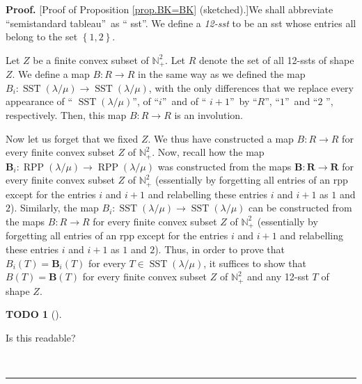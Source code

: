 \documentclass[numbers=enddot,12pt,final,onecolumn,notitlepage]{scrartcl}%
\theoremstyle{definition}
\newtheorem{quest}[theo]{TODO}
\newenvironment{todo}[1][]
{\begin{quest}[#1]\begin{leftbar}}
{\end{leftbar}\end{quest}}
\newenvironment{proof}[1][Proof]{\noindent\textbf{#1.} }{\ \rule{0.5em}{0.5em}}
\begin{document}
\begin{proof}
[Proof of Proposition \ref{prop.BK=BK} (sketched).]We shall abbreviate
\textquotedblleft semistandard tableau\textquotedblright\ as \textquotedblleft
sst\textquotedblright. We define a \textit{12-sst} to be an sst whose entries
all belong to the set $\left\{  1,2\right\}  $.

Let $Z$ be a finite convex subset of $\mathbb{N}_{+}^{2}$. Let $R$ denote the
set of all 12-ssts of shape $Z$. We define a map $B:R\rightarrow R$ in the
same way as we defined the map $B_{i}:\operatorname*{SST}\left(  \lambda
/\mu\right)  \rightarrow\operatorname*{SST}\left(  \lambda/\mu\right)  $, with
the only differences that we replace every appearance of \textquotedblleft%
$\operatorname*{SST}\left(  \lambda/\mu\right)  $\textquotedblright, of
\textquotedblleft$i$\textquotedblright\ and of \textquotedblleft%
$i+1$\textquotedblright\ by \textquotedblleft$R$\textquotedblright,
\textquotedblleft$1$\textquotedblright\ and \textquotedblleft$2$%
\textquotedblright, respectively. Then, this map $B:R\rightarrow R$ is an involution.

Now let us forget that we fixed $Z$. We thus have constructed a map
$B:R\rightarrow R$ for every finite convex subset $Z$ of $\mathbb{N}_{+}^{2}$.
Now, recall how the map $\mathbf{B}_{i}:\operatorname*{RPP}\left(  \lambda
/\mu\right)  \rightarrow\operatorname*{RPP}\left(  \lambda/\mu\right)  $ was
constructed from the maps $\mathbf{B}:\mathbf{R}\rightarrow\mathbf{R}$ for
every finite convex subset $Z$ of $\mathbb{N}_{+}^{2}$ (essentially by
forgetting all entries of an rpp except for the entries $i$ and $i+1$ and
relabelling these entries $i$ and $i+1$ as $1$ and $2$). Similarly, the map
$B_{i}:\operatorname*{SST}\left(  \lambda/\mu\right)  \rightarrow
\operatorname*{SST}\left(  \lambda/\mu\right)  $ can be constructed from the
maps $B:R\rightarrow R$ for every finite convex subset $Z$ of $\mathbb{N}%
_{+}^{2}$ (essentially by forgetting all entries of an rpp except for the
entries $i$ and $i+1$ and relabelling these entries $i$ and $i+1$ as $1$ and
$2$). Thus, in order to prove that $B_{i}\left(  T\right)  =\mathbf{B}%
_{i}\left(  T\right)  $ for every $T\in\operatorname*{SST}\left(  \lambda
/\mu\right)  $, it suffices to show that $B\left(  T\right)  =\mathbf{B}%
\left(  T\right)  $ for every finite convex subset $Z$ of $\mathbb{N}_{+}^{2}$
and any 12-sst $T$ of shape $Z$.

\begin{todo}
Is this readable?
\end{todo}


\end{proof}
\end{document}
